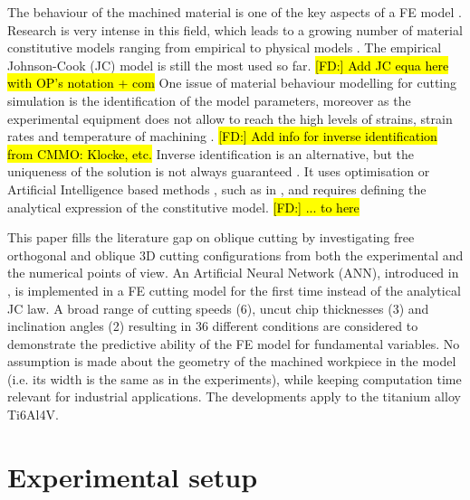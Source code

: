 \documentclass[final,5p,times,twocolumn]{elsarticle}
\DeclareRobustCommand{\FD}[1]{ {\begingroup\sethlcolor{VWgreen}\textcolor{black}{\hl{[FD:] #1}}\endgroup} }
\begin{document}
The behaviour of the machined material is one of the key aspects of a FE model \cite{arrazola_recent_2013, melkote_advances_2017}. Research is very intense in this field, which leads to a growing number of material constitutive models ranging from empirical to physical models \cite{melkote_advances_2017}. The empirical Johnson-Cook (JC) model \cite{johnson_constitutive_1983} is still the most used so far. \FD{Add JC equa here with OP's notation + com} One issue of material behaviour modelling for cutting simulation is the identification of the model parameters, moreover as the experimental equipment does not allow to reach the high levels of strains, strain rates and temperature of machining \cite{melkote_advances_2017}. \FD{Add info for inverse identification from CMMO: Klocke, etc.} Inverse identification is an alternative, but the uniqueness of the solution is not always guaranteed \cite{arrazola_recent_2013}. It uses optimisation or Artificial Intelligence based methods \cite{melkote_advances_2017}, such as in \cite{hardt_investigations_2021}, and requires defining the analytical expression of the constitutive model.\FD{... to here}

This paper fills the literature gap on oblique cutting by investigating free orthogonal and oblique 3D cutting configurations from both the experimental and the numerical points of view. An Artificial Neural Network (ANN), introduced in \cite{pantale_efficient_2022}, is implemented in a FE cutting model for the first time instead of the analytical JC law. A broad range of cutting speeds (6), uncut chip thicknesses (3) and inclination angles (2) resulting in 36 different conditions are considered to demonstrate the predictive ability of the FE model for fundamental variables. No assumption is made about the geometry of the machined workpiece in the model (i.e. its width is the same as in the experiments), while keeping computation time relevant for industrial applications. The developments apply to the titanium alloy Ti6Al4V.

\section{Experimental setup}
\label{ExpSet}
\end{document}
